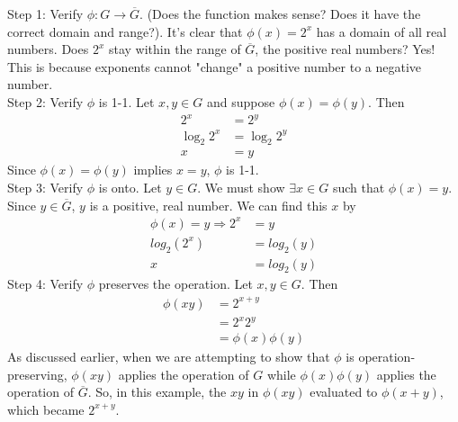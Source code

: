 \documentclass{article} \usepackage{amsmath}
\begin{document}
Step 1: Verify $\phi \colon G \to \overline{G}$. (Does the function makes sense? Does it have
the correct domain and range?). It's clear that $\phi(x)=2^{x}$ has a domain of all real numbers.
Does $2^{x}$ stay within the range of $\overline{G}$, the positive real numbers? Yes! This is because
exponents cannot "change" a positive number to a negative number. \[\]
Step 2: Verify $\phi$ is 1-1. Let $x,y \in G$ and suppose $\phi(x)=\phi(y)$. Then
\begin{align*}
2^{x} &= 2^{y} \\
\log_{2}2^{x} &= \log_{2}2^{y} \\
x &= y
\end{align*}
Since $\phi(x) = \phi(y)$ implies $x = y$, $\phi$ is 1-1. \[\]
Step 3: Verify $\phi$ is onto. Let $y \in G$. We must show $\exists x \in G$ such that $\phi(x) = y$. Since
$y \in \overline{G}$, $y$ is a positive, real number. We can find this $x$ by
\begin{align*}
\phi(x) =y \Rightarrow 2^{x} &= y \\
log_{2}(2^{x}) &= log_{2}(y) \\
x &= log_{2}(y)
\end{align*} \[\]
Step 4: Verify $\phi$ preserves the operation. Let $x,y \in G$. Then
\begin{align*}
\phi(xy) &= 2^{x+y} \\
&= 2^{x}2^{y} \\
&= \phi(x)\phi(y)
\end{align*}  
As discussed earlier, when we are attempting to show that $\phi$ is operation-preserving, $\phi(xy)$
applies the operation of $G$ while $\phi(x)\phi(y)$ applies the operation of $\overline{G}$. So, in
this example, the $xy$ in $\phi(xy)$ evaluated to $\phi(x+y)$, which became $2^{x+y}$.
\end{document}
